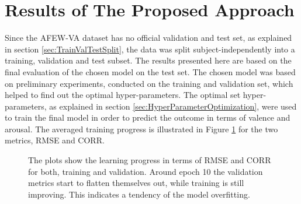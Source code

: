 \section{Results of The Proposed Approach} \label{sec:ResultsProposedApproach}
Since the AFEW-VA dataset has no official validation and test set, as explained in section \ref{sec:TrainValTestSplit}, the data was split subject-independently into a training, validation and test subset. The results presented here are based on the final evaluation of the chosen model on the test set. The chosen model was based on preliminary experiments, conducted on the training and validation set, which helped to find out the optimal hyper-parameters.
\newline\newline
The optimal set hyper-parameters, as explained in section \ref{sec:HyperParameterOptimization}, were used to train the final model in order to predict the outcome in terms of valence and arousal. The averaged training progress is illustrated in Figure \ref{fig:LearningCurveResults} for the two metrics, RMSE and CORR.

\begin{figure}[H]
  \centering
  \hfill
  \caption[Training cures of the proposed approach]{The plots show the learning progress in terms of RMSE and CORR for both, training and validation. Around epoch 10 the validation metrics start to flatten themselves out, while training is still improving. This indicates a tendency of the model overfitting.}
  \label{fig:LearningCurveResults}
\end{figure}

